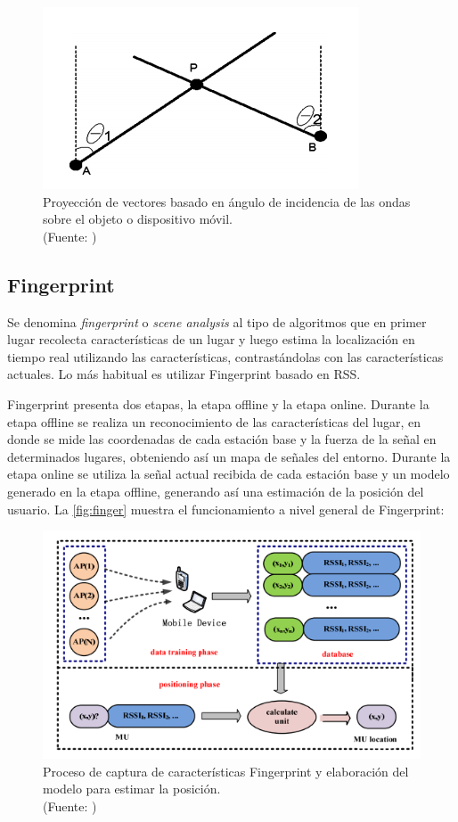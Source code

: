 \begin{enumerate}
\begin{enumerate}
\begin{figure}[ht!]
\centering
\includegraphics[width=.6\textwidth]{figures/angulacion.png}
\caption[Proyección de vectores AoA]{Proyección de vectores basado en ángulo de incidencia de las ondas sobre el objeto o dispositivo móvil.\\
{\scriptsize (Fuente: \citep{Liu:2007:SWI:2220431.2221077})}}
\label{fig:angulacion}
\end{figure}

\end{enumerate}
\end{enumerate}


\subsection{Fingerprint}

Se denomina \textit{fingerprint} o \textit{scene analysis} al tipo de algoritmos que en primer lugar recolecta características de un lugar y luego estima la localización en tiempo real utilizando las características, contrastándolas con las características actuales. Lo más habitual es utilizar Fingerprint basado en RSS.

Fingerprint presenta dos etapas, la etapa offline y la etapa online. Durante la etapa offline se realiza un reconocimiento de las características del lugar, en donde se mide las coordenadas de cada estación base y la fuerza de la señal en determinados lugares, obteniendo así un mapa de señales del entorno.  Durante la etapa online se utiliza la señal actual recibida de cada estación base y un modelo generado en la etapa offline, generando así una estimación de la posición del usuario. La  \autoref{fig:finger} muestra el funcionamiento a nivel general de Fingerprint:

\begin{figure}[ht!]
\centering
\includegraphics[width=.6\textwidth]{figures/finger.png}
\caption[Proceso de creación Fingerprint]{Proceso de captura de características Fingerprint y elaboración del modelo para estimar la posición.\\
{\scriptsize (Fuente: \citep{Liu:2007:SWI:2220431.2221077})}}
\label{fig:finger}
\end{figure}

